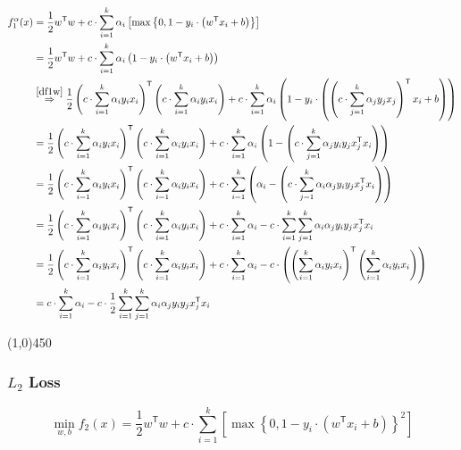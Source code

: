\documentclass[15pt,landscape]{article}
\newcommand{\hr}{\begin{center} \line(1,0){450} \end{center}}
\newcommand{\tr}{^\mathsf{T}}
\begin{document}
\begin{align}
f_1^\alpha(x) &= \frac{1}{2} w\tr w +c \cdot \sum\limits_{i=1}^k \alpha_i \left[ \oneLossReg \right] \nonumber \\
&= \frac{1}{2} w\tr w +c \cdot \sum\limits_{i=1}^k \alpha_i \left(  1-y_i \cdot \left( w\tr x_i + b \right) \right)\\
&\stackrel{\eqref{df1w}}{\Rightarrow} \frac{1}{2} \left( c \cdot \sum\limits_{i=1}^k \alpha_i  y_i x_i \right)\tr \left( c \cdot \sum\limits_{i=1}^k \alpha_i  y_i x_i \right) +c \cdot \sum\limits_{i=1}^k \alpha_i \left(  1-y_i \cdot \left( \left( c \cdot \sum\limits_{j=1}^k \alpha_j  y_j x_j \right)\tr x_i + b \right) \right)\\
&= \frac{1}{2} \left( c \cdot \sum\limits_{i=1}^k \alpha_i  y_i x_i \right)\tr \left( c \cdot \sum\limits_{i=1}^k \alpha_i  y_i x_i \right) +c \cdot \sum\limits_{i=1}^k \alpha_i \left(  1- \left( c \cdot \sum\limits_{j=1}^k \alpha_j y_i  y_j x_j\tr x_i \right)  \right)\\
&= \frac{1}{2} \left( c \cdot \sum\limits_{i=1}^k \alpha_i  y_i x_i \right)\tr \left( c \cdot \sum\limits_{i=1}^k \alpha_i  y_i x_i \right) +c \cdot \sum\limits_{i=1}^k \left(  \alpha_i  -  \left( c \cdot \sum\limits_{j=1}^k \alpha_i \alpha_j y_i  y_j x_j\tr x_i \right)  \right)\\
&= \frac{1}{2} \left( c \cdot \sum\limits_{i=1}^k \alpha_i  y_i x_i \right)\tr \left( c \cdot \sum\limits_{i=1}^k \alpha_i  y_i x_i \right) +c \cdot \sum\limits_{i=1}^k   \alpha_i  - c \cdot   \sum\limits_{i=1}^k \sum\limits_{j=1}^k \alpha_i \alpha_j y_i  y_j x_j\tr x_i \\
&= \frac{1}{2} \left( c \cdot \sum\limits_{i=1}^k \alpha_i  y_i x_i \right)\tr \left( c \cdot \sum\limits_{i=1}^k \alpha_i  y_i x_i \right) +c \cdot \sum\limits_{i=1}^k   \alpha_i  - c \cdot \left(  \left(\sum\limits_{i=1}^k \alpha_i  y_i x_i \right)\tr \left(\sum\limits_{i=1}^k \alpha_i  y_i x_i \right) \right) \\
&= c \cdot \sum\limits_{i=1}^k   \alpha_i  - c \cdot \frac{1}{2} \sum\limits_{i=1}^k \sum\limits_{j=1}^k \alpha_i \alpha_j y_i  y_j x_j\tr x_i \\
\end{align}


\hr
\subsubsection*{$L_2$ Loss}
\begin{equation}
\min\limits_{w,b} f_2(x) = \frac{1}{2} w\tr w +c \cdot \sum\limits_{i=1}^k \left[ \max \left\{ 0,1-y_i \cdot \left( w\tr x_i + b \right) \right\}^2\right]
\end{equation}
\newcommand{\twoLossReg}{\max \left\{ 0,1-y_i \cdot \left( w\tr x_i + b \right)\right\}^2 }
\end{document}
